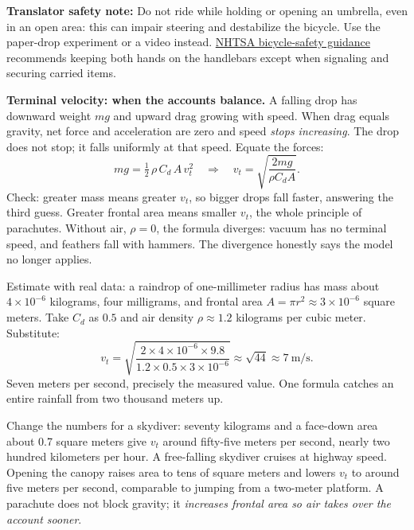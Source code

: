 \textbf{Translator safety note:} Do not ride while holding or opening an umbrella, even in an open area: this can impair steering and destabilize the bicycle. Use the paper-drop experiment or a video instead. \href{https://www.nhtsa.gov/road-safety/bicycle-safety}{NHTSA bicycle-safety guidance} recommends keeping both hands on the handlebars except when signaling and securing carried items.

\textbf{Terminal velocity: when the accounts balance.} A falling drop has downward weight \(mg\) and upward drag growing with speed. When drag equals gravity, net force and acceleration are zero and speed \emph{stops increasing}. The drop does not stop; it falls uniformly at that speed. Equate the forces:
\[
mg=\tfrac12\,\rho\, C_d\, A\, v_t^2
\quad\Longrightarrow\quad
v_t=\sqrt{\dfrac{2mg}{\rho C_d A}} .
\]
Check: greater mass means greater \(v_t\), so bigger drops fall faster, answering the third guess. Greater frontal area means smaller \(v_t\), the whole principle of parachutes. Without air, \(\rho=0\), the formula diverges: vacuum has no terminal speed, and feathers fall with hammers. The divergence honestly says the model no longer applies.

Estimate with real data: a raindrop of one-millimeter radius has mass about \(4\times10^{-6}\) kilograms, four milligrams, and frontal area \(A=\pi r^2\approx3\times10^{-6}\) square meters. Take \(C_d\) as \(0.5\) and air density \(\rho\approx1.2\) kilograms per cubic meter. Substitute:
\[
v_t=\sqrt{\dfrac{2\times4\times10^{-6}\times9.8}{1.2\times0.5\times3\times10^{-6}}}
\approx\sqrt{44}\approx 7\ \text{m/s}.
\]
Seven meters per second, precisely the measured value. One formula catches an entire rainfall from two thousand meters up.

Change the numbers for a skydiver: seventy kilograms and a face-down area about 0.7 square meters give \(v_t\) around fifty-five meters per second, nearly two hundred kilometers per hour. A free-falling skydiver cruises at highway speed. Opening the canopy raises area to tens of square meters and lowers \(v_t\) to around five meters per second, comparable to jumping from a two-meter platform. A parachute does not block gravity; it \emph{increases frontal area so air takes over the account sooner}.

